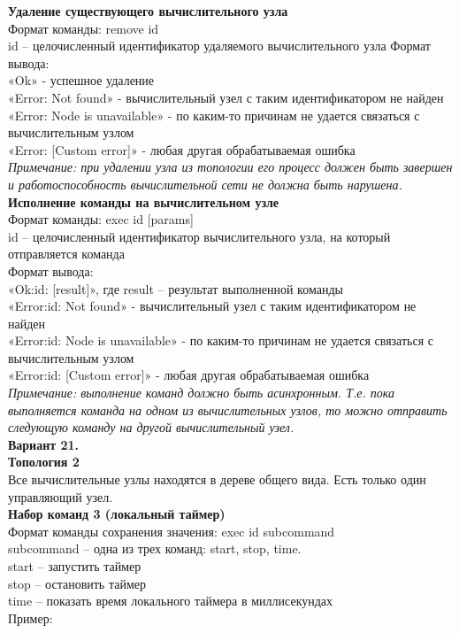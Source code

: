 \textbf{Удаление существующего вычислительного узла}\\
Формат команды: remove id\\
id – целочисленный идентификатор удаляемого вычислительного узла
Формат вывода:\\
«Ok» - успешное удаление\\
«Error: Not found» - вычислительный узел с таким идентификатором не найден\\
«Error: Node is unavailable» - по каким-то причинам не удается связаться с вычислительным узлом\\
«Error: [Custom error]» - любая другая обрабатываемая ошибка\\
\textit{Примечание: при удалении узла из топологии его процесс должен быть завершен и
работоспособность вычислительной сети не должна быть нарушена.
}\\

\textbf{Исполнение команды на вычислительном узле}\\
Формат команды: exec id [params]\\
id – целочисленный идентификатор вычислительного узла, на который отправляется команда\\
Формат вывода:\\
«Ok:id: [result]», где result – результат выполненной команды\\
«Error:id: Not found» - вычислительный узел с таким идентификатором не найден\\
«Error:id: Node is unavailable» - по каким-то причинам не удается связаться с вычислительным
узлом\\
«Error:id: [Custom error]» - любая другая обрабатываемая ошибка\\
\textit{Примечание: выполнение команд должно быть асинхронным. Т.е. пока выполняется команда на
одном из вычислительных узлов, то можно отправить следующую команду на другой
вычислительный узел.}\\

\textbf{Вариант 21.}\\ 
\textbf{Топология 2}\\
Все вычислительные узлы находятся в дереве общего вида. Есть только один управляющий узел. \\

\textbf{Набор команд 3 (локальный таймер)}\\
Формат команды сохранения значения: exec id subcommand\\
subcommand – одна из трех команд: start, stop, time.\\
start – запустить таймер\\
stop – остановить таймер\\
time – показать время локального таймера в миллисекундах\\
Пример:

